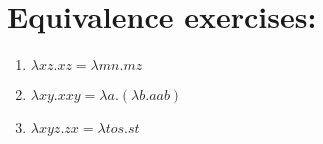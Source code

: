 \documentclass[11pt]{article}
\author{Abhigya Maskay}
\date{\today}
\title{}
\begin{document}
\section{Equivalence exercises:}
\label{sec:orgf5fd8c7}

\begin{enumerate}
\item \({\lambda}xz.xz = {\lambda}mn.mz\)
\item \({\lambda}xy.xxy = {\lambda}a.({\lambda}b.aab)\)
\item \({\lambda}xyz.zx = {\lambda}tos.st\)
\end{enumerate}
\end{document}
